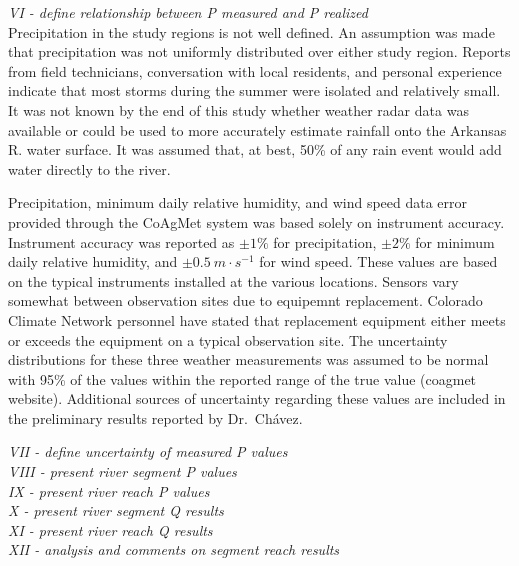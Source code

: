 \begin{linenumbers}
\emph{VI - define relationship between P measured and P realized}\\

Precipitation in the study regions is not well defined.  An assumption was made that precipitation was not uniformly distributed over either study region.  Reports from field technicians, conversation with local residents, and personal experience indicate that most storms during the summer were isolated and relatively small.  It was not known by the end of this study whether weather radar data was available or could be used to more accurately estimate rainfall onto the Arkansas R. water surface.  It was assumed that, at best, 50\% of any rain event would add water directly to the river.

Precipitation, minimum daily relative humidity, and wind speed data error provided through the CoAgMet system was based solely on instrument accuracy.  Instrument accuracy was reported as $\pm1\%$ for precipitation, $\pm2\%$ for minimum daily relative humidity, and $\pm0.5~m \cdot s^{-1}$ for wind speed.  These values are based on the typical instruments installed at the various locations.  Sensors vary somewhat between observation sites due to equipemnt replacement.  Colorado Climate Network personnel have stated that replacement equipment either meets or exceeds the equipment on a typical observation site.  The uncertainty distributions for these three weather measurements was assumed to be normal with 95\% of the values within the reported range of the true value (coagmet website).  Additional sources of uncertainty regarding these values are included in the preliminary results reported by Dr.\ Ch\'{a}vez.

\emph{VII - define uncertainty of measured P values}\\

\emph{VIII - present river segment P values}\\

\emph{IX - present river reach P values}\\

\emph{X - present river segment Q results}\\

\emph{XI - present river reach Q results}\\

\emph{XII - analysis and comments on segment reach results}\\

\clearpage{}

\end{linenumbers}
